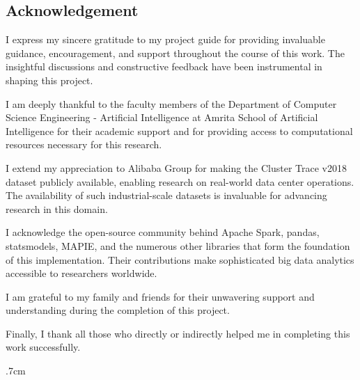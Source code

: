 \documentclass[12pt]{report}
\begin{document}
	
	\newpage
	\baselineskip 1cm
	\tableofcontents
	\newpage
	\begin{center}
		\section*{Acknowledgement}
	\end{center}
	
	I express my sincere gratitude to my project guide for providing invaluable guidance, encouragement, and support throughout the course of this work. The insightful discussions and constructive feedback have been instrumental in shaping this project.
	
	I am deeply thankful to the faculty members of the Department of Computer Science Engineering - Artificial Intelligence at Amrita School of Artificial Intelligence for their academic support and for providing access to computational resources necessary for this research.
	
	I extend my appreciation to Alibaba Group for making the Cluster Trace v2018 dataset publicly available, enabling research on real-world data center operations. The availability of such industrial-scale datasets is invaluable for advancing research in this domain.
	
	I acknowledge the open-source community behind Apache Spark, pandas, statsmodels, MAPIE, and the numerous other libraries that form the foundation of this implementation. Their contributions make sophisticated big data analytics accessible to researchers worldwide.
	
	I am grateful to my family and friends for their unwavering support and understanding during the completion of this project.
	
	Finally, I thank all those who directly or indirectly helped me in completing this work successfully.

	
	\baselineskip .7cm
	
	
	
	
	
	
	\cleardoublepage
	\listoffigures
	
	\cleardoublepage
	
	\listoftables\clearpage
	
\end{document}
